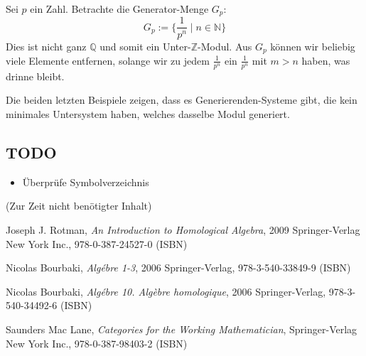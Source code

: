 \documentclass[a4paper]{amsart}
\theoremstyle{definition}
\newcommand{\Q}{\ensuremath{\mathbb{ Q }}}
\newcommand{\Z}{\ensuremath{\mathbb{ Z }}}
\newcommand{\N}{\ensuremath{\mathbb{ N }}}
\begin{document}
Sei $p$ ein Zahl. Betrachte die Generator-Menge $G_p$:
\begin{equation}\label{p}
   G_p := \{\frac{1}{p^n} \mid n \in \N \}
\end{equation}
Dies ist nicht ganz $\Q$ und somit ein Unter-$\Z$-Modul. Aus $G_p$ können wir beliebig viele Elemente entfernen, solange wir zu jedem $\frac{1}{p^n}$ ein $\frac{1}{p^n}$ mit $m > n$ haben, was drinne bleibt. 

Die beiden letzten Beispiele zeigen, dass es Generierenden-Systeme gibt, die kein minimales Untersystem haben, welches dasselbe Modul generiert.


\begin{backup}
\section{TODO}
\begin{itemize}
     \item Überprüfe Symbolverzeichnis
\end{itemize}


\end{backup}

\begin{backup}
    (Zur Zeit nicht benötigter Inhalt)
\end{backup}

\begin{thebibliography}{9}
   	Joseph J. Rotman, \emph{An Introduction to Homological Algebra},
   	2009 Springer-Verlag New York Inc., 978-0-387-24527-0 (ISBN)

      Nicolas Bourbaki, \emph{Algébre 1-3},
      2006 Springer-Verlag, 978-3-540-33849-9 (ISBN)

      Nicolas Bourbaki, \emph{Algébre 10. Algèbre homologique},
      2006 Springer-Verlag, 978-3-540-34492-6 (ISBN)

      Saunders Mac Lane, \emph{Categories for the Working Mathematician},
      Springer-Verlag New York Inc., 978-0-387-98403-2 (ISBN)

\end{thebibliography}
\end{document}
